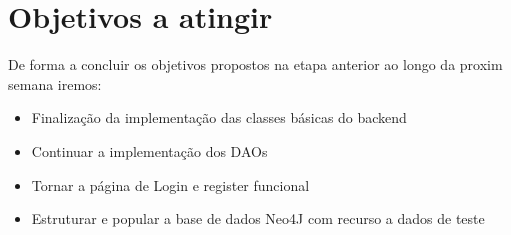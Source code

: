 \documentclass[a4paper]{report}
\begin{document}
\chapter{Objetivos a atingir}
De forma a concluir os objetivos propostos na etapa anterior ao longo da proxim
semana iremos:
\begin{itemize}
    \item Finalização da implementação das classes básicas do backend
    \item Continuar a implementação dos DAOs
    \item Tornar a página de Login e register funcional
    \item Estruturar e popular a base de dados Neo4J com recurso a dados de teste
\end{itemize}
\end{document}

